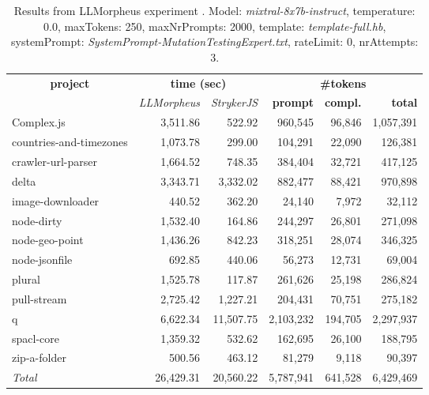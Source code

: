 
\begin{table*}[hbt!]
\centering
{\scriptsize
\begin{tabular}{l||r|r|r|r|r}
\multicolumn{1}{c|}{\bf project} & \multicolumn{2}{|c|}{\bf time (sec)} & \multicolumn{3}{|c|}{\bf \#tokens} \\
               & {\it LLMorpheus} & {\it StrykerJS} & {\bf prompt} & {\bf compl.} & {\bf total} \\
\hline
  Complex.js & 3,511.86 & 522.92 & 960,545 & 96,846 & 1,057,391 \\ 
countries-and-timezones & 1,073.78 & 299.00 & 104,291 & 22,090 & 126,381 \\ 
crawler-url-parser & 1,664.52 & 748.35 & 384,404 & 32,721 & 417,125 \\ 
delta & 3,343.71 & 3,332.02 & 882,477 & 88,421 & 970,898 \\ 
image-downloader & 440.52 & 362.20 & 24,140 & 7,972 & 32,112 \\ 
node-dirty & 1,532.40 & 164.86 & 244,297 & 26,801 & 271,098 \\ 
node-geo-point & 1,436.26 & 842.23 & 318,251 & 28,074 & 346,325 \\ 
node-jsonfile & 692.85 & 440.06 & 56,273 & 12,731 & 69,004 \\ 
plural & 1,525.78 & 117.87 & 261,626 & 25,198 & 286,824 \\ 
pull-stream & 2,725.42 & 1,227.21 & 204,431 & 70,751 & 275,182 \\ 
q & 6,622.34 & 11,507.75 & 2,103,232 & 194,705 & 2,297,937 \\ 
spacl-core & 1,359.32 & 532.62 & 162,695 & 26,100 & 188,795 \\ 
zip-a-folder & 500.56 & 463.12 & 81,279 & 9,118 & 90,397 \\ 
\hline
  \textit{Total} & 26,429.31 & 20,560.22 & 5,787,941 & 641,528 & 6,429,469 \\
  \end{tabular}
  }
  \\[2mm]
  \caption{Results from LLMorpheus experiment .
    Model: \textit{mixtral-8x7b-instruct}, 
    temperature: 0.0, 
    maxTokens: 250, 
    maxNrPrompts: 2000, 
    template: \textit{template-full.hb}, 
    systemPrompt: \textit{SystemPrompt-MutationTestingExpert.txt}, 
    rateLimit: 0, 
    nrAttempts: 3.  
  }
  \label{table:Cost:run363:mixtral-8x7b-instruct:template-full.hb:0.0}
\end{table*}